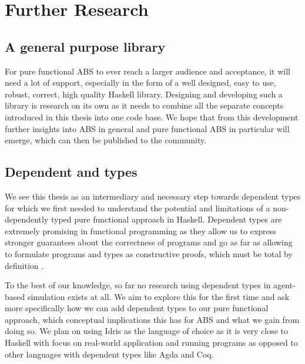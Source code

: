 \section{Further Research}
\subsection{A general purpose library}
For pure functional ABS to ever reach a larger audience and acceptance, it will need a lot of support, especially in the form of a well designed, easy to use, robust, correct, high quality Haskell library. Designing and developing such a library is research on its own as it needs to combine all the separate concepts introduced in this thesis into one code base. We hope that from this development further insights into ABS in general and pure functional ABS in particular will emerge, which can then be published to the community.


\subsection{Dependent and types}
We see this thesis as an intermediary and necessary step towards dependent types for which we first needed to understand the potential and limitations of a non-dependently typed pure functional approach in Haskell. Dependent types are extremely promising in functional programming as they allow us to express stronger guarantees about the correctness of programs and go as far as allowing to formulate programs and types as constructive proofs, which must be total by definition \cite{altenkirch_pi_2010, altenkirch_why_2005, thompson_type_1991}.

To the best of our knowledge, so far no research using dependent types in agent-based simulation exists at all. We aim to explore this for the first time and ask more specifically how we can add dependent types to our pure functional approach, which conceptual implications this has for ABS and what we gain from doing so. We plan on using Idris \cite{brady_idris_2013} as the language of choice as it is very close to Haskell with focus on real-world application and running programs as opposed to other languages with dependent types like Agda and Coq.


